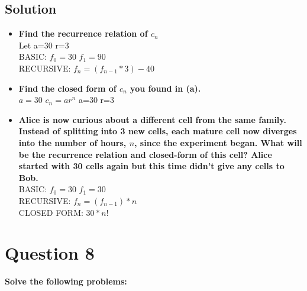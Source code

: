 \documentclass[11pt]{article}
\begin{document}
    \subsection*{Solution}
    \begin{itemize}
        \item \textbf{Find the recurrence relation of \(c_{n}\)} \\
        Let a=30 r=3 \\
        BASIC: \(f_{0}=30\) \(f_{1} = 90\) \\
        RECURSIVE: \(f_{n}=(f_{n-1} *3) -40\)
        \item \textbf{Find the closed form of \(c_{n}\) you found in (a).} \\
        \(a= 30\) \(c_{n}=ar^n\) a=30 r=3
        \item \textbf{Alice is now curious about a different cell from the same family. Instead of splitting into 3 new cells, each mature cell now diverges into the number of hours, \(n\), since the experiment began. What will be the recurrence relation and closed-form of this cell? Alice started with 30 cells again but this time didn’t give any cells to Bob.} \\
        BASIC: \(f_{0}=30\) \(f_{1}=30\) \\
        RECURSIVE: \(f_{n}=(f_{n-1})*n\) \\
        CLOSED FORM: \(30 * n!\)
    \end{itemize}


\clearpage
\section*{Question 8}
    \textbf{Solve the following problems:}
\end{document}
